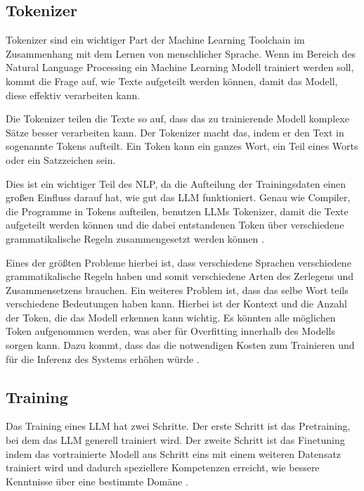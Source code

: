 \subsection{Tokenizer}
\label{s:intro:llm:token}
Tokenizer sind ein wichtiger Part der Machine Learning Toolchain 
im Zusammenhang mit dem Lernen von menschlicher Sprache.
Wenn im Bereich des Natural Language Processing ein Machine 
Learning Modell trainiert werden soll, kommt die Frage auf, wie Texte
aufgeteilt werden können, damit das Modell, diese effektiv
verarbeiten kann.\par
Die Tokenizer teilen die Texte so auf, dass das zu trainierende
Modell komplexe Sätze besser verarbeiten kann. 
Der Tokenizer macht das, indem er den Text in sogenannte
Tokens aufteilt. Ein Token kann ein ganzes Wort, ein Teil eines
Worts oder ein Satzzeichen sein.\par
Dies ist ein wichtiger Teil des NLP, da die Aufteilung der 
Trainingsdaten einen großen Einfluss darauf hat, wie gut das 
LLM funktioniert. Genau wie Compiler, die Programme in
Tokens aufteilen, benutzen LLMs Tokenizer, damit 
die Texte aufgeteilt werden können und die dabei entstandenen Token über 
verschiedene grammatikalische Regeln zusammengesetzt werden können \cite{perryWhatTokenizationNatural2021}.\par
Eines der größten Probleme hierbei ist, dass verschiedene Sprachen verschiedene
grammatikalische Regeln haben und somit verschiedene Arten des 
Zerlegens und Zusammensetzens brauchen. 
Ein weiteres Problem ist, dass das selbe Wort teils verschiedene Bedeutungen haben
kann. Hierbei ist der Kontext und die Anzahl der Token, die das 
Modell erkennen kann wichtig. Es könnten alle möglichen Token aufgenommen werden, 
was aber für Overfitting innerhalb des Modells sorgen kann.
Dazu kommt, dass das die notwendigen Kosten zum Trainieren und für die Inferenz 
des Systems erhöhen würde \cite{perryWhatTokenizationNatural2021, Llama2RunMaster}.

\subsection{Training}
\label{s:intro:llm:train}
Das Training eines LLM hat zwei Schritte. Der erste Schritt 
ist das Pretraining, bei dem das LLM generell trainiert wird. 
Der zweite Schritt ist das Finetuning indem das vortrainierte 
Modell aus Schritt eins mit einem weiteren Datensatz trainiert 
wird und dadurch speziellere Kompetenzen erreicht, wie bessere 
Kenntnisse über eine bestimmte Domäne \cite{dasFineTuneLarge2024, craigPretrainingLasso2024}.


